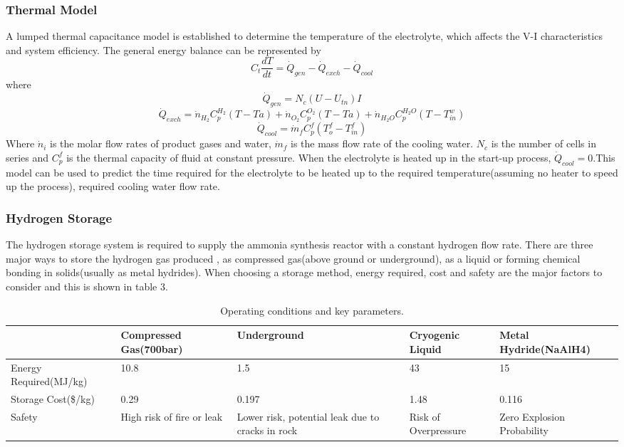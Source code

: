 \subsubsection{Thermal Model}
A lumped thermal capacitance model is established to determine the temperature of the electrolyte, which affects the V-I characteristics and system efficiency. The general energy balance can be represented by
\begin{equation}
C_t\frac{dT}{dt} = \dot{Q}_{gen}- \dot{Q}_{exch}-\dot{Q}_{cool}
\end{equation}
where 
\begin{equation}
\dot{Q}_{gen} = N_c(U-U_{tn})I 
\end{equation}
\begin{equation}
\dot{Q}_{exch} = \dot{n}_{H_2} C_p^{H_2}(T - Ta) + \dot{n}_{O_2}C_p^{O_2}(T - Ta)+ \dot{n}_{H_2O}C_p^{H_2O}(T - T_{in}^w)
\end{equation}
\begin{equation}
\dot{Q}_{cool} = \dot{m}_fC_p^f(T_o^f - T_{in}^f) 
\end{equation}
Where $\dot{n}_i$ is the molar flow rates of product gases and water, $\dot{m}_f$ is the mass flow rate of the cooling water. $N_c$ is the number of cells in series and $C_p^f$ is the thermal capacity of fluid at constant pressure.
When the electrolyte is heated up in the start-up process, $\dot{Q}_{cool} = 0$.This model can be used to predict the time required for the electrolyte to be heated up to the required temperature(assuming no heater to speed up the process), required cooling water flow rate. 

\subsubsection{Hydrogen  Storage }
The hydrogen storage system is required to supply the ammonia synthesis reactor with a constant hydrogen flow rate. There are three major ways to store the hydrogen gas produced , as compressed gas(above ground or underground), as a liquid or forming chemical bonding in solids(usually as metal hydrides).
When choosing a storage method, energy required, cost and safety are the major factors to consider and this is shown in table 3.
\begin{table}[H]
\begin{tabular}{ |p{4.4cm}|p{2.5cm}|p{2.5cm}|p{2.9cm}| p{2.5cm}|} 
 \hline
  & Compressed Gas(700bar) & Underground & Cryogenic Liquid   & Metal Hydride(NaAlH4) \\ 
 \hline
 Energy Required(MJ/kg) & 10.8  & 1.5  &43    & 15\\ 
 \hline
Storage Cost(\$/kg) & 0.29  & 0.197  &1.48 & 0.116\\ 
 \hline
 Safety & High risk of fire or leak & Lower risk, potential leak due to cracks in rock & Risk of Overpressure & Zero Explosion Probability \\
 \hline
\end{tabular}
\caption{\label{tab:table-name}Operating conditions and key parameters.\cite{storage2}\cite{storage}\cite{gas2}\cite{gas3}}
\end{table}

